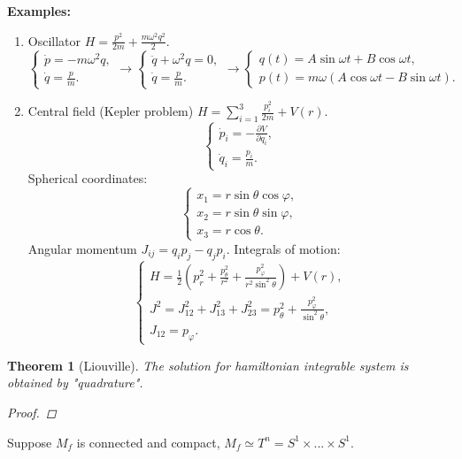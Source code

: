 \documentclass[12pt]{article}
\newtheorem{theorem}{Theorem}[]
\theoremstyle{definition}
\begin{document}
\textbf{Examples:}
\begin{enumerate}
    \item Oscillator $H=\frac{p^2}{2m}+\frac{m\omega^2q^2}{2}$.
    \begin{equation}
        \begin{cases}
            \dot{p}=-m\omega^2q,\\
            \dot{q}=\frac{p}{m}.
        \end{cases}\rightarrow\begin{cases}
            \ddot{q}+\omega^2q=0,\\
            \dot{q}=\frac{p}{m}.
        \end{cases}\rightarrow\begin{cases}
            q(t)=A\sin\omega t+B\cos\omega t,\\
            p(t)=m\omega(A\cos\omega t-B\sin\omega t).
        \end{cases}
    \end{equation}
    \item Central field (Kepler problem) $H=\sum\limits_{i=1}^3\frac{p_i^2}{2m}+V(r)$.
    \begin{equation}
        \begin{cases}
            \dot{p}_i=-\frac{\partial V}{\partial q_i},\\
            \dot{q}_i=\frac{p_i}{m}.
        \end{cases}
    \end{equation}
    Spherical coordinates:
    \begin{equation}
    \begin{cases}
        x_1=r\sin\theta\cos\varphi,\\
        x_2=r\sin\theta\sin\varphi,\\
        x_3=r\cos\theta.
    \end{cases} 
    \end{equation}
    Angular momentum $J_{ij}=q_ip_j-q_jp_i$. Integrals of motion:
    \begin{equation}
        \begin{cases}
            H=\frac{1}{2}\left(p_r^2+\frac{p_\theta^2}{r^2}+\frac{p_\varphi^2}{r^2\sin^2\theta}\right)+V(r),\\
            J^2=J_{12}^2+J_{13}^2+J_{23}^2=p_\theta^2+\frac{p_\varphi^2}{\sin^2\theta},\\
            J_{12}=p_\varphi.
        \end{cases}
    \end{equation}
\end{enumerate}
\begin{theorem}[Liouville]
    The solution for hamiltonian integrable system is obtained by "quadrature".
    \begin{proof}[Proof]
    \end{proof}
\end{theorem}
Suppose $M_f$ is connected and compact, $M_f\simeq T^n=S^1\times...\times S^1$.
\end{document}
